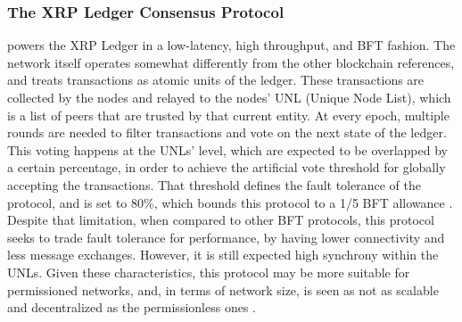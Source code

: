 \documentclass[journal]{IEEEtran}
\begin{document}
\subsubsection{The XRP Ledger Consensus Protocol} powers the XRP Ledger in a
low-latency, high throughput, and  BFT fashion. The network itself operates somewhat
differently from the other blockchain references, and treats transactions as atomic units of 
the ledger. These transactions are collected by the nodes and relayed to the
nodes' UNL (Unique Node List), which is a list of peers that are trusted by that current
entity. At every epoch, multiple rounds are needed to filter transactions and vote 
on the next state of the ledger. This voting happens at the 
UNLs' level, which are expected to be overlapped by a certain percentage,
in order to achieve the artificial vote threshold for globally accepting the transactions.
That threshold defines the fault tolerance of the protocol, and is set to 80\%, which 
bounds this protocol to a 1/5 BFT allowance \cite{schwartz2014ripple, chase2018analysis}. 
Despite that limitation, when compared to other BFT protocols, this protocol seeks to trade 
fault tolerance for performance, by having lower connectivity and less message exchanges. 
However, it is still expected high synchrony within the UNLs. Given these characteristics, this protocol
may be more suitable for permissioned networks, and, in terms of network size,
is seen as not as scalable and decentralized as the permissionless ones \cite{survey-dist-consensus}.
\end{document}
